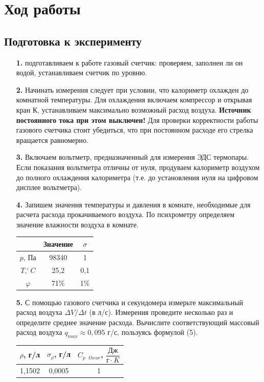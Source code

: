 \documentclass[a4paper, 12pt]{article}%
\begin{document}
\section*{Ход работы}
\subsection*{Подготовка к эксперименту}
\begin{enumerate}
\item [\textbf{1.}] подготавливаем к работе газовый счетчик: проверяем, заполнен ли он водой, устанавливаем счетчик по уровню.
\item [\textbf{2.}] Начинать измерения следует при условии, что калориметр охлажден до комнатной температуры. Для охлаждения включаем компрессор и открывая кран К, устанавливаем максимально возможный расход воздуха. \textbf{Источник постоянного тока при этом выключен!}
Для проверки корректности работы газового счетчика стоит убедиться, что при постоянном расходе его стрелка вращается равномерно.
\item [\textbf{3.}] Включаем вольтметр, предназначенный для измерения ЭДС термопары. Если показания вольтметра отличны от нуля, продуваем калориметр воздухом до полного охлаждения калориметра (т.е. до установления нуля на цифровом дисплее вольтметра).
\item [\textbf{4.}]Запишем значения температуры и давления в комнате, необходимые для расчета расхода прокачиваемого воздуха. По психрометру определяем значение влажности воздуха в комнате.
\begin{center}
    \begin{tabular}{|c|c|c|}
\hline
               & Значение & $\sigma$ \\ \hline
$p$, Па        & 98340    & 1        \\ \hline
$T, ^{\circ}C$ & 25,2     & 0,1      \\ \hline
$\varphi$         & 71\%     & 1\%      \\ \hline
\end{tabular}
  \end{center}
\item [\textbf{5.}] С помощью газового счетчика и секундомера измерьте максимальный расход воздуха $\Delta V/ \Delta t$ (в л/с). Измерения проведите несколько раз и определите среднее значение расхода. Вычислите соответствующий массовый расход воздуха $q_{max} \approx 0,095$ г/с, пользуясь формулой (5).
\begin{center}
\begin{tabular}{|c|c|c|}
\hline
$\rho$, г/л & $\sigma_{\rho}$, г/л & $C_{p \text{ } theor}$, $\dfrac{\text{Дж}}{\text{г}\cdot K}$ \\\hline
1,1502      & 0,0005               & 1                                           \\ \hline
\end{tabular}


\end{center}
\end{enumerate}
\end{document}
